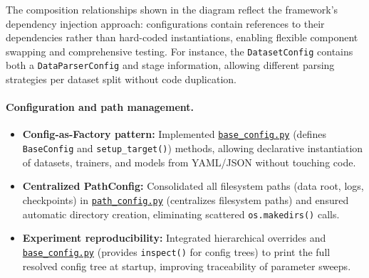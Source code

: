 The composition relationships shown in the diagram reflect the framework's dependency injection approach: configurations contain references to their dependencies rather than hard-coded instantiations, enabling flexible component swapping and comprehensive testing. For instance, the \texttt{DatasetConfig} contains both a \texttt{DataParserConfig} and stage information, allowing different parsing strategies per dataset split without code duplication.

\paragraph{Configuration and path management.}
\begin{itemize}[leftmargin=*]
  \item \textbf{Config-as-Factory pattern:} Implemented \href{https://github.com/JanDuchscherer104/UniTraj/blob/main/unitraj/utils/base_config.py}{\texttt{base\_config.py}} (defines \texttt{BaseConfig} and \texttt{setup\_target()}) methods, allowing declarative instantiation of datasets, trainers, and models from YAML/JSON without touching code.
  \item \textbf{Centralized PathConfig:} Consolidated all filesystem paths (data root, logs, checkpoints) in \href{https://github.com/JanDuchscherer104/UniTraj/blob/main/unitraj/configs/path_config.py}{\texttt{path\_config.py}} (centralizes filesystem paths) and ensured automatic directory creation, eliminating scattered \texttt{os.makedirs()} calls.
  \item \textbf{Experiment reproducibility:} Integrated hierarchical overrides and \href{https://github.com/JanDuchscherer104/UniTraj/blob/main/unitraj/utils/base_config.py}{\texttt{base\_config.py}} (provides \texttt{inspect()} for config trees) to print the full resolved config tree at startup, improving traceability of parameter sweeps.
\end{itemize}

